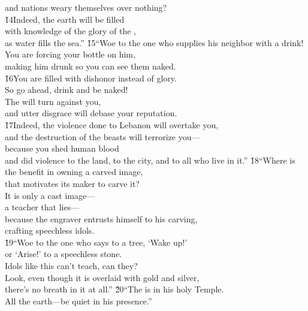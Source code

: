 \begin{poetry}
\poemlll       and nations weary themselves over nothing? \\
\poeml \v{14}Indeed, the earth will be filled \\
\poemll    with knowledge of the glory of the , \\
\poemlll       as water fills the sea.''
\poeml \v{15}``Woe to the one who supplies his neighbor with a drink! \\
\poemll    You are forcing your bottle on him, \\
\poemlll       making him drunk so you can see them naked. \\
\poeml \v{16}You are filled with dishonor instead of glory. \\
\poemll    So go ahead, drink and be naked! \\
\poemll    The  will turn against you, \\
\poemll    and utter disgrace will debase your reputation. \\
\poeml \v{17}Indeed, the violence done to Lebanon will overtake you, \\
\poemll    and the destruction of the beasts will terrorize you--- \\
\poeml because you shed human blood \\
\poemll    and did violence to the land, to the city, and to all who live in it.''
\poeml \v{18}``Where is the benefit in owning a carved image, \\
\poemll    that motivates its maker to carve it? \\
\poeml It is only a cast image--- \\
\poemll    a teacher that lies--- \\
\poeml because the engraver entrusts himself to his carving, \\
\poemll    crafting speechless idols. \\
\poeml \v{19}``Woe to the one who says to a tree, `Wake up!' \\
\poemll    or `Arise!' to a speechless stone. \\
\poeml Idols like this can't teach, can they? \\
\poemll    Look, even though it is overlaid with gold and silver, \\
\poemlll       there's no breath in it at all.''
\poeml \v{20}``The  is in his holy Temple. \\
\poemll    All the earth---be quiet in his presence.''
\end{poetry}

